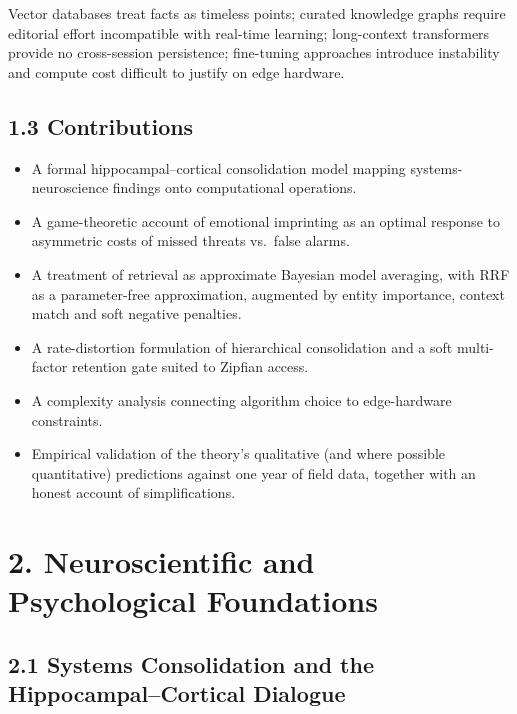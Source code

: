 \documentclass[]{article}
\begin{document}
Vector databases treat facts as timeless points; curated knowledge graphs
require editorial effort incompatible with real-time learning; long-context
transformers provide no cross-session persistence; fine-tuning approaches
introduce instability and compute cost difficult to justify on edge
hardware.

\hypertarget{contributions}{%
\subsection{\texorpdfstring{\textbf{1.3
Contributions}}{1.3 Contributions}}\label{contributions}}

\begin{itemize}
\item A formal hippocampal--cortical consolidation model mapping
  systems-neuroscience findings onto computational operations.
\item A game-theoretic account of emotional imprinting as an optimal
  response to asymmetric costs of missed threats vs.\ false alarms.
\item A treatment of retrieval as approximate Bayesian model averaging,
  with RRF as a parameter-free approximation, augmented by entity
  importance, context match and soft negative penalties.
\item A rate-distortion formulation of hierarchical consolidation and a
  soft multi-factor retention gate suited to Zipfian access.
\item A complexity analysis connecting algorithm choice to edge-hardware
  constraints.
\item Empirical validation of the theory's qualitative (and where possible
  quantitative) predictions against one year of field data, together with
  an honest account of simplifications.
\end{itemize}

\hypertarget{neuroscientific-and-psychological-foundations}{%
\section{\texorpdfstring{\textbf{2. Neuroscientific and Psychological
Foundations}}{2. Neuroscientific and Psychological Foundations}}\label{neuroscientific-and-psychological-foundations}}

\hypertarget{systems-consolidation}{%
\subsection{\texorpdfstring{\textbf{2.1 Systems Consolidation and the
Hippocampal--Cortical
Dialogue}}{2.1 Systems Consolidation and the Hippocampal--Cortical Dialogue}}\label{systems-consolidation}}
\end{document}

